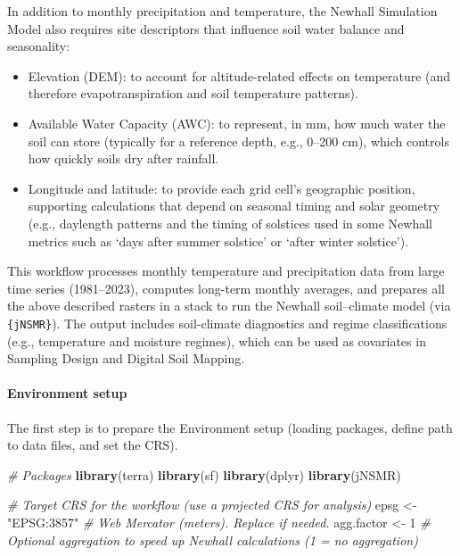 \documentclass[
  10pt,
  b5paper,
  oneside]{book}
\newenvironment{Shaded}{\begin{snugshade}}{\end{snugshade}}
\newcommand{\CommentTok}[1]{\textcolor[rgb]{0.56,0.35,0.01}{\textit{#1}}}
\newcommand{\DecValTok}[1]{\textcolor[rgb]{0.00,0.00,0.81}{#1}}
\newcommand{\FunctionTok}[1]{\textcolor[rgb]{0.13,0.29,0.53}{\textbf{#1}}}
\newcommand{\NormalTok}[1]{#1}
\newcommand{\OtherTok}[1]{\textcolor[rgb]{0.56,0.35,0.01}{#1}}
\newcommand{\StringTok}[1]{\textcolor[rgb]{0.31,0.60,0.02}{#1}}
\begin{document}
In addition to monthly precipitation and temperature, the Newhall Simulation Model also requires site descriptors that influence soil water balance and seasonality:

\begin{itemize}
\item
  Elevation (DEM): to account for altitude-related effects on temperature (and therefore evapotranspiration and soil temperature patterns).
\item
  Available Water Capacity (AWC): to represent, in mm, how much water the soil can store (typically for a reference depth, e.g., 0--200 cm), which controls how quickly soils dry after rainfall.
\item
  Longitude and latitude: to provide each grid cell's geographic position, supporting calculations that depend on seasonal timing and solar geometry (e.g., daylength patterns and the timing of solstices used in some Newhall metrics such as `days after summer solstice' or `after winter solstice').
\end{itemize}

This workflow processes monthly temperature and precipitation data from large time series (1981--2023), computes long-term monthly averages, and prepares all the above described rasters in a stack to run the Newhall soil--climate model (via \texttt{\{jNSMR\}}). The output includes soil-climate diagnostics and regime classifications (e.g., temperature and moisture regimes), which can be used as covariates in Sampling Design and Digital Soil Mapping.

\paragraph*{Environment setup}\label{environment-setup}

The first step is to prepare the Environment setup (loading packages, define path to data files, and set the CRS).

\begin{Shaded}
\begin{Highlighting}[]
\CommentTok{\# Packages}
\FunctionTok{library}\NormalTok{(terra)}
\FunctionTok{library}\NormalTok{(sf)}
\FunctionTok{library}\NormalTok{(dplyr)}
\FunctionTok{library}\NormalTok{(jNSMR)}

\CommentTok{\# Target CRS for the workflow (use a projected CRS for analysis)}
\NormalTok{epsg }\OtherTok{\textless{}{-}} \StringTok{"EPSG:3857"}   \CommentTok{\# Web Mercator (meters). Replace if needed.}
\NormalTok{agg.factor }\OtherTok{\textless{}{-}} \DecValTok{1}       \CommentTok{\# Optional aggregation to speed up Newhall calculations (1 = no aggregation)}
\end{Highlighting}
\end{Shaded}
\end{document}
